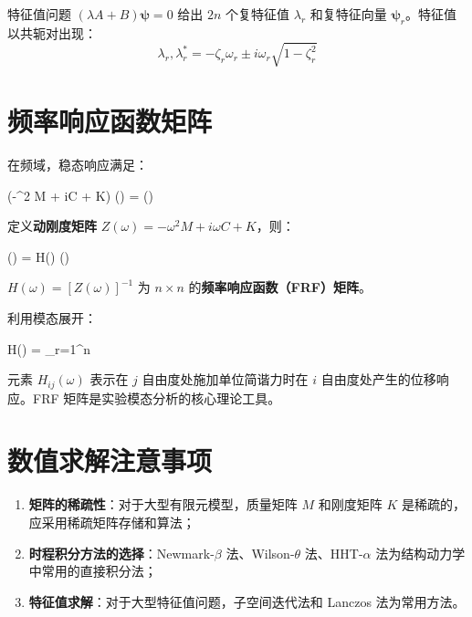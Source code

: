 特征值问题 $(\lambda A + B) \boldsymbol{\psi} = 0$ 给出 $2n$ 个复特征值 $\lambda_r$ 和复特征向量 $\boldsymbol{\psi}_r$。特征值以共轭对出现：
\[
\lambda_r, \lambda_r^* = -\zeta_r \omega_r \pm i \omega_r \sqrt{1 - \zeta_r^2}
\]

\section{频率响应函数矩阵}

在频域，稳态响应满足：
\begin{myformula}
	(-\omega^2 M + i\omega C + K) (\omega) = (\omega)
\end{myformula}
定义\textbf{动刚度矩阵} $Z(\omega) = -\omega^2 M + i\omega C + K$，则：
\begin{myformula}
	(\omega) = H(\omega) (\omega)
\end{myformula}
$H(\omega) = [Z(\omega)]^{-1}$ 为 $n \times n$ 的\textbf{频率响应函数（FRF）矩阵}。

利用模态展开：
\begin{myformula}
	H(\omega) = \sum_{r=1}^{n} 
\end{myformula}

元素 $H_{ij}(\omega)$ 表示在 $j$ 自由度处施加单位简谐力时在 $i$ 自由度处产生的位移响应。FRF 矩阵是实验模态分析的核心理论工具。

\section{数值求解注意事项}

\begin{enumerate}
	\item \textbf{矩阵的稀疏性}：对于大型有限元模型，质量矩阵 $M$ 和刚度矩阵 $K$ 是稀疏的，应采用稀疏矩阵存储和算法；
	\item \textbf{时程积分方法的选择}：Newmark-$\beta$ 法、Wilson-$\theta$ 法、HHT-$\alpha$ 法为结构动力学中常用的直接积分法；
	\item \textbf{特征值求解}：对于大型特征值问题，子空间迭代法和 Lanczos 法为常用方法。
\end{enumerate}

